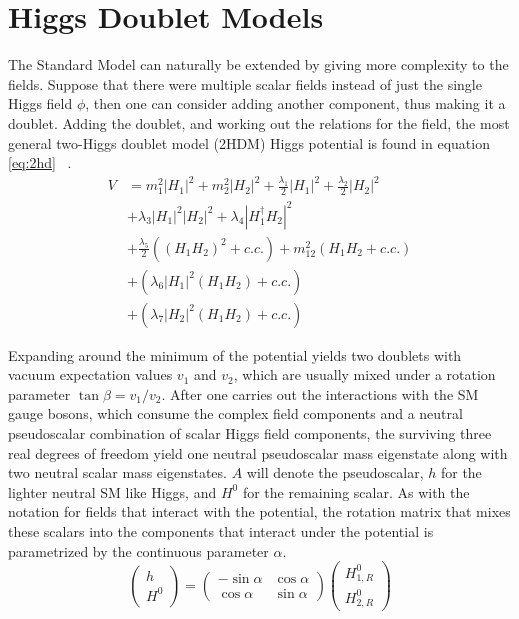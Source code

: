 \section{Higgs Doublet Models}
The Standard Model can naturally be extended by giving more complexity to the fields. 
Suppose that there were multiple scalar fields instead of just the single Higgs field $\phi$, then one can consider adding another component, thus making it a doublet. Adding the doublet, and working out the relations for the field, the most general two-Higgs doublet model (2HDM) Higgs potential is found in equation \ref{eq:2hd} ~\cite{Branco_2012}.
\begin{align} 
\label{eq:2hd}
V &= m^2_1|H_1|^2 + m^2_2|H_2|^2 + \frac{\lambda_1}{2}|H_1|^2 + \frac{\lambda_2}{2}|H_2|^2  \\
    &+\lambda_3|H_1|^2|H_2|^2 + \lambda_4|H^\dag_1 H_2|^2 \nonumber \\
    &+\frac{\lambda_5}{2}\left((H_1H_2)^2 + c.c.\right) +m^2_{12}\left(H_1 H_2 + c.c.\right) \nonumber \\
    &+\left(\lambda_6|H_1|^2(H_1 H_2) + c.c.\right) \nonumber \\
    &+\left(\lambda_7|H_2|^2(H_1 H_2) + c.c.\right) \nonumber 
\end{align}

Expanding around the minimum of the potential yields two doublets with vacuum expectation values $v_1$ and $v_2$, which are usually mixed under a rotation parameter $\tan \beta = v_1 / v_2$. After one carries out the interactions with the SM gauge bosons, which consume the complex field components and a neutral pseudoscalar combination of scalar Higgs field components, the surviving three real degrees of freedom yield one neutral pseudoscalar mass eigenstate along with two neutral scalar mass eigenstates. $A$ will denote the pseudoscalar, $h$ for the lighter neutral SM like Higgs, and $H^0$ for the remaining scalar. As with the notation for fields that interact with the potential, the rotation matrix that mixes these scalars into the components that interact under the potential is parametrized by the continuous parameter $\alpha$. 
\begin{equation}
\begin{pmatrix} h \\ H^0\end{pmatrix} = \begin{pmatrix} -\sin\alpha & \cos\alpha \\ \cos\alpha & \sin\alpha \end{pmatrix}   \begin{pmatrix}H^0_{1,R} \\ H^0_{2,R}\end{pmatrix} 
\end{equation}



